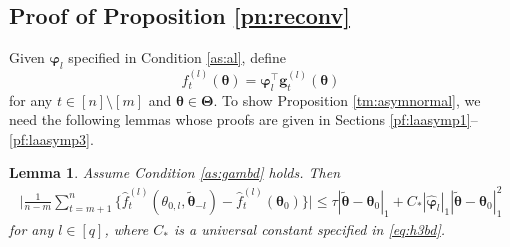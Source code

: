 \documentclass[12pt]{article}
\newtheorem{lemma}{Lemma}
\newcommand{\bTheta}{\boldsymbol \Theta}
\newcommand{\btheta}{\boldsymbol \theta}
\newcommand{\bvarphi}{\boldsymbol \varphi}
\def\T{{\scriptscriptstyle \top} }
\newcommand{\bg}{{\mathbf g}}
\newcommand{\0}{{\bf 0}}
\begin{document}










\subsection{Proof of Proposition \ref{pn:reconv}} \label{pr:pn:reconv}

Given $\bvarphi_l$ specified in Condition \ref{as:al}, define
\[
f_t^{(l)}(\btheta)=\bvarphi_l^{\T}\bg_t^{(l)}(\btheta)
\]
for any $t\in[n]\setminus[m]$ and $\btheta\in\bTheta$. 
To show Proposition \ref{tm:asymnormal}, we need the following lemmas whose proofs are given in Sections \ref{pf:laasymp1}--\ref{pf:laasymp3}.

\begin{lemma}\label{la:asym1}
Assume Condition {\rm\ref{as:gambd}} holds. Then
\begin{align*}
\bigg|\frac{1}{n-m}\sum_{t=m+1}^n\big\{\hat{f}_t^{(l)}(\theta_{0,l},\tilde{\btheta}_{-l})-\hat{f}_t^{(l)}(\btheta_0)\big\}\bigg|\leq \tau |\tilde{\btheta}-\btheta_{0}|_1+C_*|\hat{\bvarphi}_l|_1 |\tilde{\btheta}-\btheta_{0}|_1^2
\end{align*}
for any $l\in[q]$, where $C_*$ is a universal constant specified in \eqref{eq:h3bd}. 
\end{lemma}
\end{document}
